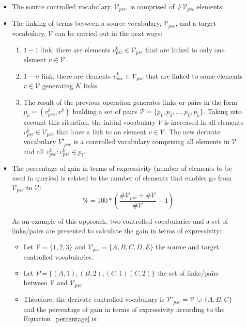 \begin{itemize}
 \item The source controlled vocabulary, $\mathcal{V}_{psc}$, is comprised of \#$\mathcal{V}_{psc}$ elements.
 \item The linking of terms between a source vocabulary, $\mathcal{V}_{psc}$, and  a target vocabulary, $\mathcal{V}$ can be carried out in the next ways:
 \begin{enumerate}
  \item $1-1$ link, there are elements $v^k_{psc} \in \mathcal{V}_{psc}$ that are linked to only one element $v \in \mathcal{V}$.
  \item $1-n$ link, there are elements $v^k_{psc} \in \mathcal{V}_{psc}$ that are linked to some elements $v \in \mathcal{V}$ generating $K$ links.  
  \item The result of the previous operation generates links or pairs in the form $p_k=(v^k_{psc}, v^k)$ building a set of pairs $\mathcal{P}=\{p_1,p_2,...,p_k,p_n\}$. Taking into account this situation, 
  the initial vocabulary $V$ is increased in all elements $v^k_{psc} \in \mathcal{V}_{psc}$ that have a link to an element $v \in \mathcal{V}$. The new 
  derivate vocabulary $V'_{psc}$ is a controlled vocabulary comprising all elements in $\mathcal{V}$ and all $v^k_{psc}: v^k_{psc} \in p_i$.
 \end{enumerate}
 
 \item The percentage of gain in terms of expressivity (number of elements to be used in queries) is related to the number of elements that enables go from $\mathcal{V}_{psc}$ to $\mathcal{V}$:	
 \begin{equation}\label{percentage}
  \%=100*(\frac{\#\mathcal{V}_{psc} + \#\mathcal{V}}{\#\mathcal{V}}-1)
 \end{equation}
 
  As an example of this approach, two controlled vocabularies and a set of links/pairs are presented to calculate the gain in terms of expressivity:
  \begin{itemize}
  \item Let $\mathcal{V} = \{ 1, 2, 3 \}$  and  $\mathcal{V}_{psc} = \{A, B, C, D, E\}$ the source and target controlled vocabularies.
  \item Let $P = \{ (A,1), (B,2), (C,1) (C,2) \}$ the set of links/pairs between $\mathcal{V}$ and $\mathcal{V}_{psc}$.
  \item Therefore, the derivate controlled vocabulary is $\mathcal{V'}_{psc} = \mathcal{V}\,\cup\,\{A, B, C\}$ and the percentage of gain in terms of expressivity 
  according to the Equation~\ref{percentage} is:


\end{itemize}
\end{itemize}
